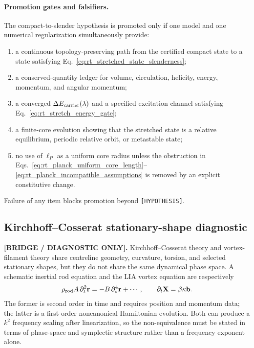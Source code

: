 \paragraph{Promotion gates and falsifiers.}
The compact-to-slender hypothesis is promoted only if one model and one
numerical regularization simultaneously provide:
\begin{enumerate}
    \item a continuous topology-preserving path from the certified compact
    state to a state satisfying Eq.~\eqref{eq:rt_stretched_state_slenderness};
    \item a conserved-quantity ledger for volume, circulation, helicity,
    energy, momentum, and angular momentum;
    \item a converged $\Delta E_{\rm carrier}(\lambda)$ and a specified excitation
    channel satisfying Eq.~\eqref{eq:rt_stretch_energy_gate};
    \item a finite-core evolution showing that the stretched state is a
    relative equilibrium, periodic relative orbit, or metastable state;
    \item no use of $\ell_P$ as a uniform core radius unless the obstruction in
    Eqs.~\eqref{eq:rt_planck_uniform_core_length}--\eqref{eq:rt_planck_incompatible_assumptions}
    is removed by an explicit constitutive change.
\end{enumerate}
Failure of any item blocks promotion beyond \texttt{[HYPOTHESIS]}.

\subsection{Kirchhoff--Cosserat stationary-shape diagnostic}
\label{subsec:rt_kirchhoff_cosserat_guard}

\textbf{[BRIDGE / DIAGNOSTIC ONLY].}
Kirchhoff--Cosserat theory and vortex-filament theory share centreline
geometry, curvature, torsion, and selected stationary shapes, but they do not
share the same dynamical phase space.  A schematic inertial rod equation and
the LIA vortex equation are respectively
\begin{equation}
    \rho_{\rm rod}A\,\partial_t^2\mathbf r
    =
    -B\,\partial_s^4\mathbf r+\cdots,
    \qquad
    \partial_t\mathbf X
    =
    \beta\kappa\mathbf b.
    \label{eq:rt_rod_vortex_time_order}
\end{equation}
The former is second order in time and requires position and momentum data;
the latter is a first-order noncanonical Hamiltonian evolution.  Both can
produce a $k^2$ frequency scaling after linearization, so the non-equivalence
must be stated in terms of phase-space and symplectic structure rather than a
frequency exponent alone.

